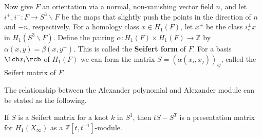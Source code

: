 Now give $F$ an orientation via a normal, non-vanishing vector field $n$, and let $i^+,i^- : F \rightarrow S^3 \backslash F$ be the maps that slightly push the points in the direction of $n$ and $-n$, respectively. For a homology class $x \in H_1(F)$, let $x^\pm$ be the class $i_*^\pm x$ in $H_1(S^3 \backslash F)$. Define the pairing $\alpha : H_1(F) \times H_1(F) \rightarrow \mathbb Z$ by $\alpha(x,y) = \beta(x,y^+)$. This is called the \textbf{Seifert form} of $F$. For a basis $\lcb x_i \rcb$ of $H_1(F)$ we can form the matrix $S = (\alpha(x_i,x_j))_{ij}$, called the Seifert matrix of $F$.

The relationship between the Alexander polynomial and Alexander module can be stated as the following.

\begin{thm}
If $S$ is a Seifert matrix for a knot $k$ in $S^3$, then $tS-S^T$ is a presentation matrix for $H_1(X_\infty)$ as a $\mathbb Z[t,t^{-1}]$-module.
\end{thm}

